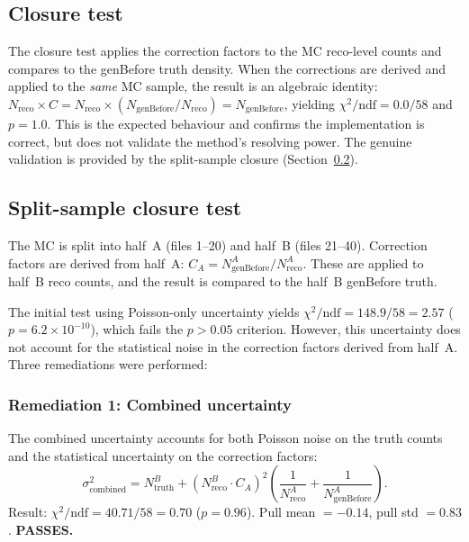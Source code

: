 \documentclass[11pt,a4paper]{article}
\begin{document}
\subsection{Closure test}
\label{sec:closure}

The closure test applies the correction factors to the MC reco-level
counts and compares to the genBefore truth density.  When the
corrections are derived and applied to the \emph{same} MC sample,
the result is an algebraic identity:
$N_\text{reco} \times C = N_\text{reco} \times
(N_\text{genBefore}/N_\text{reco}) = N_\text{genBefore}$, yielding
$\chi^2/\text{ndf} = 0.0/58$ and $p = 1.0$.  This is the expected
behaviour and confirms the implementation is correct, but does not
validate the method's resolving power.  The genuine validation is
provided by the split-sample closure (Section~\ref{sec:split-closure}).

\subsection{Split-sample closure test}
\label{sec:split-closure}

The MC is split into half~A (files 1--20) and half~B (files 21--40).
Correction factors are derived from half~A: $C_A = N_\text{genBefore}^A
/ N_\text{reco}^A$.  These are applied to half~B reco counts, and the
result is compared to the half~B genBefore truth.

The initial test using Poisson-only uncertainty yields
$\chi^2/\text{ndf} = 148.9/58 = 2.57$ ($p = 6.2 \times 10^{-10}$),
which fails the $p > 0.05$ criterion.  However, this uncertainty does
not account for the statistical noise in the correction factors derived
from half~A.  Three remediations were performed:

\subsubsection{Remediation 1: Combined uncertainty}

The combined uncertainty accounts for both Poisson noise on the truth
counts and the statistical uncertainty on the correction factors:
\begin{equation}
  \sigma^2_\text{combined} = N_\text{truth}^B +
  \left(N_\text{reco}^B \cdot C_A\right)^2
  \left(\frac{1}{N_\text{reco}^A} + \frac{1}{N_\text{genBefore}^A}\right).
  \label{eq:combined-sigma}
\end{equation}
Result: $\chi^2/\text{ndf} = 40.71/58 = 0.70$ ($p = 0.96$).  Pull
mean $= -0.14$, pull std $= 0.83$.  \textbf{PASSES.}
\end{document}
